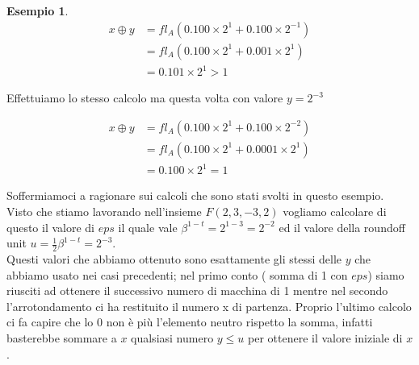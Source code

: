 \documentclass[12pt, a4paper]{book}
\theoremstyle{definition}
\newtheorem{exmp}{Esempio}[section]
\begin{document}
\begin{flushleft}
\begin{exmp}
\begin{equation} \label{}
	\begin{split}
		x \oplus y & = fl_{A}(0.100 \times 2^{1} +  0.100 \times 2^{-1}) \\
 		   				& =  fl_{A}(0.100 \times 2^{1} +  0.001 \times 2^{1}) \\
 		   				& =  0.101 \times 2^{1} > 1
	\end{split}
\end{equation}

Effettuiamo lo stesso calcolo ma questa volta con valore $y=2^{-3}$

\begin{equation} \label{}
	\begin{split}
		x \oplus y & = fl_{A}(0.100 \times 2^{1} +  0.100 \times 2^{-2}) \\
 		   				& =  fl_{A}(0.100 \times 2^{1} +  0.0001 \times 2^{1}) \\
 		   				& =  0.100 \times 2^{1} = 1
	\end{split}
\end{equation}

Soffermiamoci a ragionare sui calcoli che sono stati svolti in questo esempio. Visto che stiamo lavorando nell'insieme $F(2,3,-3,2)$ vogliamo calcolare di questo il valore di $eps$ il quale vale $\beta^{1-t} = 2 ^ {1-3} = 2^{-2}$ ed il valore della roundoff unit $u = \frac{1}{2}\beta^{1-t} = 2^{-3}$.\\
Questi valori che abbiamo ottenuto sono esattamente gli stessi delle $y$ che abbiamo usato nei casi precedenti; nel primo conto ( somma di 1 con $eps$) siamo riusciti ad ottenere il successivo numero di macchina di 1 mentre nel secondo l'arrotondamento ci ha restituito il numero x di partenza.
Proprio l'ultimo calcolo ci fa capire che lo 0 non è più l'elemento neutro rispetto la somma,  infatti basterebbe sommare a $x$ qualsiasi numero $y \leq u$ per ottenere il valore iniziale di $x$.
\end{exmp}
\end{flushleft}
\end{document}
